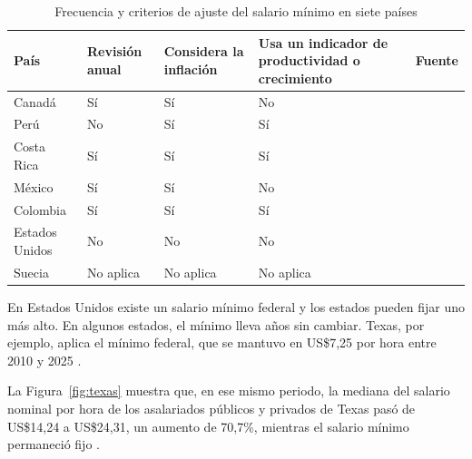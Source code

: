 \begin{table}[H]
\centering\small
\caption{Frecuencia y criterios de ajuste del salario mínimo en siete países}
\label{tab:reglas}
\renewcommand{\arraystretch}{1.16}
\begin{tabularx}{\textwidth}{@{}>{\raggedright\arraybackslash}p{2.2cm}>{\centering\arraybackslash}p{1.65cm}>{\centering\arraybackslash}p{2.15cm}>{\centering\arraybackslash}p{2.85cm}>{\raggedright\arraybackslash}X@{}}
\toprule
País & Revisión anual & Considera la inflación & Usa un indicador de productividad o crecimiento & Fuente\\
\midrule
Canadá & Sí & Sí & No & \citet{canada}\\[4pt]
Perú & No & Sí & Sí & \citet{peru}\\[4pt]
Costa Rica & Sí & Sí & Sí & \citet{costarica}\newline\citet{costaricaDecreto2026}\\[4pt]
México & Sí & Sí & No & \citet{mexicoLeyLaboral}\\[4pt]
Colombia & Sí & Sí & Sí & \citet{c815}\\[4pt]
Estados Unidos & No & No & No & \citet{eeuu}\\[4pt]
Suecia & No aplica & No aplica & No aplica & \citet{hallbergKjellstrom2020}\\
\bottomrule
\end{tabularx}
\end{table}


En Estados Unidos existe un salario mínimo federal y los estados pueden fijar uno más alto. En algunos estados, el mínimo lleva años sin cambiar. Texas, por ejemplo, aplica el mínimo federal, que se mantuvo en US\$7,25 por hora entre 2010 y 2025 \citep{eeuu,texasMinimo}.

La Figura~\ref{fig:texas} muestra que, en ese mismo periodo, la mediana del salario nominal por hora de los asalariados públicos y privados de Texas pasó de US\$14,24 a US\$24,31, un aumento de 70,7\%, mientras el salario mínimo permaneció fijo \citep{epiTexas}.

